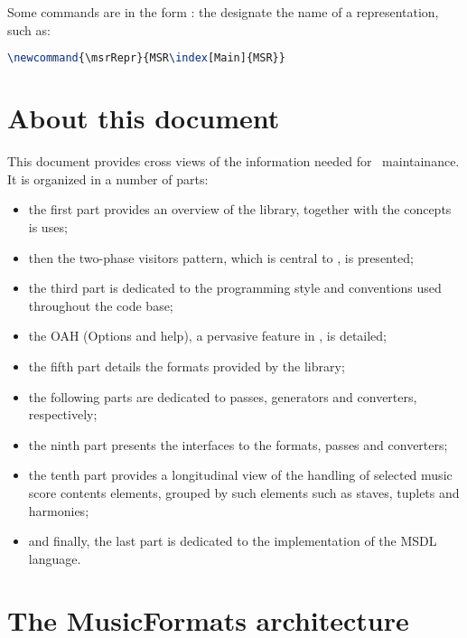 Some commands are in the form  : the designate the name of a representation, such as:
\begin{lstlisting}[language=Latex]
\newcommand{\msrRepr}{MSR\index[Main]{MSR}}
\end{lstlisting}


\section{About this document}

This document provides cross views of the information needed for \mf\ maintainance. It is organized in a number of parts:
\begin{itemize}
\item the first part provides an overview of the library, together with the concepts is uses;
\item then the two-phase visitors pattern, which is central to \mf, is presented;
\item the third part is dedicated to the programming style and conventions used throughout the code base;
\item the OAH (Options and help), a pervasive feature in \mf, is detailed;
\item the fifth part details the formats provided by the library;
\item the following parts are dedicated to passes, generators and converters, respectively;
\item the ninth part presents the interfaces to the formats, passes and converters;
\item the tenth part provides a longitudinal view of the handling of selected music score contents elements, grouped by such elements such as staves, tuplets and harmonies;
\item and finally, the last part is dedicated to the implementation of the MSDL language.
\end{itemize}


\section{The MusicFormats architecture}


